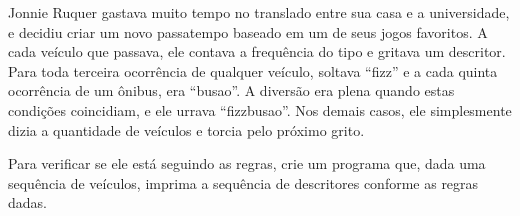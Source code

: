 Jonnie Ruquer gastava muito tempo no translado entre sua casa e a universidade, e decidiu criar um novo passatempo baseado em um de seus jogos favoritos. A cada veículo que passava, ele contava a frequência do tipo e gritava um descritor. Para toda terceira ocorrência de qualquer veículo, soltava ``fizz'' e a cada quinta ocorrência de um ônibus, era ``busao''. A diversão era plena quando estas condições coincidiam, e ele urrava ``fizzbusao''. Nos demais casos, ele simplesmente dizia a quantidade de veículos e torcia pelo próximo grito. 

Para verificar se ele está seguindo as regras, crie um programa que, dada uma sequência de veículos, imprima a sequência de descritores conforme as regras dadas.